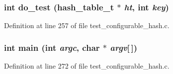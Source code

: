 \subsubsection[{do\_\-test}]{\setlength{\rightskip}{0pt plus 5cm}int do\_\-test (hash\_\-table\_\-t $\ast$ {\em ht}, \/  int {\em key})}\label{test__configurable__hash_8c_9cdbf52d290b3c15a7498a6f6f5c76a1}




Definition at line 257 of file test\_\-configurable\_\-hash.c.
\subsubsection[{main}]{\setlength{\rightskip}{0pt plus 5cm}int main (int {\em argc}, \/  char $\ast$ {\em argv}[$\,$])}\label{test__configurable__hash_8c_0ddf1224851353fc92bfbff6f499fa97}




Definition at line 272 of file test\_\-configurable\_\-hash.c.